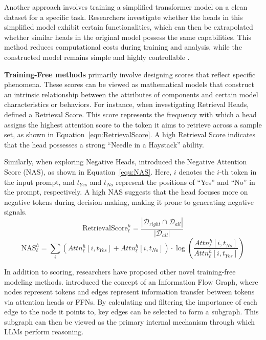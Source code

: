 \documentclass{article}
\begin{document}
Another approach involves training a simplified transformer model on a clean dataset for a specific task. Researchers investigate whether the heads in this simplified model exhibit certain functionalities, which can then be extrapolated whether similar heads in the original model possess the same capabilities. This method reduces computational costs during training and analysis, while the constructed model remains simple and highly controllable \citep{IterationHead_24_arXiv_Meta}.

\textbf{Training-Free methods} primarily involve designing scores that reflect specific phenomena. These scores can be viewed as mathematical models that construct an intrinsic relationship between the attributes of components and certain model characteristics or behaviors.
For instance, when investigating Retrieval Heads, \citet{RetrievalHead_24_arXiv_PKU} defined a Retrieval Score. This score represents the frequency with which a head assigns the highest attention score to the token it aims to retrieve across a sample set, as shown in Equation~\ref{equ:RetrievalScore}. A high Retrieval Score indicates that the head possesses a strong ``Needle in a Haystack'' ability.

Similarly, when exploring Negative Heads, \citet{NegativeHead_24_arXiv_SNU} introduced the Negative Attention Score (NAS), as shown in Equation~\ref{equ:NAS}. Here, $i$ denotes the $i$-th token in the input prompt, and $t_{Yes}$ and $t_{No}$ represent the positions of ``Yes'' and ``No'' in the prompt, respectively. A high NAS suggests that the head focuses more on negative tokens during decision-making, making it prone to generating negative signals.
\begin{equation} \label{equ:RetrievalScore}
\text{RetrievalScore}_{\ell}^{h} = \frac{|\mathcal{D}_{right} \cap \mathcal{D}_{all}|}{|\mathcal{D}_{all}|}
\end{equation}
\begin{equation} \label{equ:NAS}
\text{NAS}_{\ell}^{h} = \sum_{i}{\left(Attn_{\ell}^{h}\left[i, t_{Yes}\right] + Attn_{\ell}^{h}\left[i, t_{No}\right]\right) \cdot \log{\left(\frac{Attn_{\ell}^{h}\left[i, t_{No}\right]}{Attn_{\ell}^{h}\left[i, t_{Yes}\right]}\right)}}
\end{equation}

In addition to scoring, researchers have proposed other novel training-free modeling methods.
\citet{InformationFlow_24_arXiv_Meta} introduced the concept of an Information Flow Graph, where nodes represent tokens and edges represent information transfer between tokens via attention heads or FFNs. By calculating and filtering the importance of each edge to the node it points to, key edges can be selected to form a subgraph. This subgraph can then be viewed as the primary internal mechanism through which LLMs perform reasoning.
\end{document}
